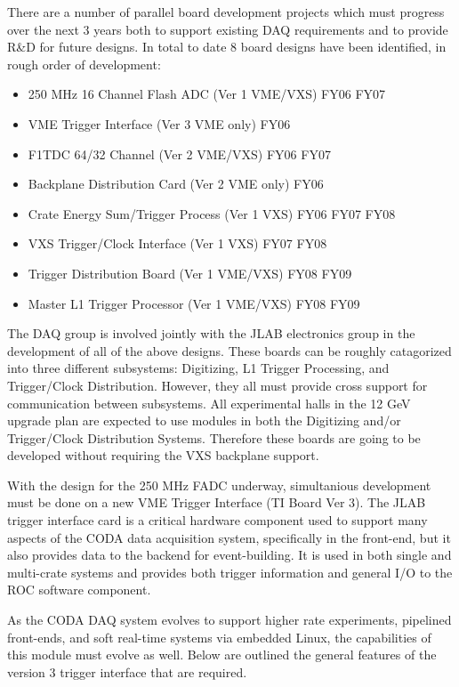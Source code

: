 \documentclass[10pt]{article}
\begin{document}
There are a number of parallel board development projects which must progress over the next 3
years both to support existing DAQ requirements and to provide R\&D for future designs.
In total to date 8 board designs have been identified, in rough order of development:
\begin{itemize}
\item 250 MHz 16 Channel Flash ADC (Ver 1 VME/VXS)  FY06 FY07
\item VME Trigger Interface (Ver 3 VME only)        FY06
\item F1TDC 64/32 Channel (Ver 2 VME/VXS)           FY06 FY07
\item Backplane Distribution Card (Ver 2 VME only)  FY06
\item Crate Energy Sum/Trigger Process (Ver 1 VXS)  FY06 FY07 FY08
\item VXS Trigger/Clock Interface (Ver 1 VXS)       FY07 FY08
\item Trigger Distribution Board (Ver 1 VME/VXS)    FY08 FY09
\item Master L1 Trigger Processor (Ver 1 VME/VXS)   FY08 FY09
\end{itemize}

The DAQ group is involved jointly with the JLAB electronics group in the 
development of all of the above designs. These boards can be roughly catagorized into
three different subsystems: Digitizing, L1 Trigger Processing, and Trigger/Clock Distribution.
However, they all must provide cross support for communication between subsystems.
All experimental halls in the 12 GeV upgrade plan are expected to use modules in both
the Digitizing and/or Trigger/Clock Distribution Systems. Therefore these boards are going
to be developed without requiring the VXS backplane support.

With the design for the 250 MHz FADC underway, simultanious development must be done on
a new VME Trigger Interface (TI Board Ver 3). The JLAB trigger interface card is a 
critical hardware component used to support many aspects of the CODA data 
acquisition system, specifically in the front-end, but it also provides data 
to the backend for event-building. It is used in both single and multi-crate systems 
and provides both trigger information and general I/O to the ROC software component.

As the CODA DAQ system evolves to support higher rate experiments, pipelined 
front-ends, and soft real-time systems via embedded Linux, the capabilities 
of this module must evolve as well. Below are outlined the general features 
of the version 3 trigger interface that are required.
\end{document}

